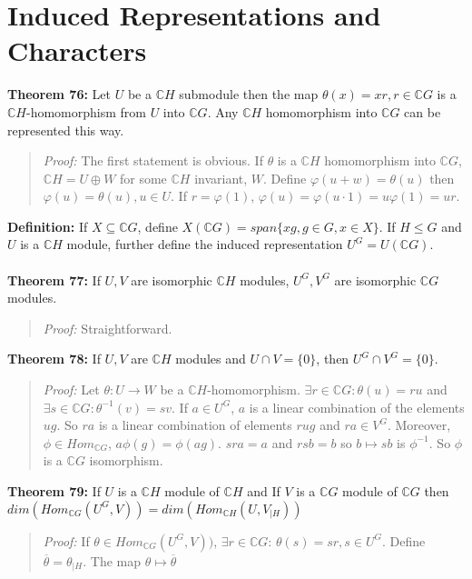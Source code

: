 {\section{Induced Representations and Characters}
{\bf Theorem 76:}
Let $U$ be a ${\mathbb C}H$ submodule then the map $\theta(x) = xr, r \in {\mathbb C}G$ is
a ${\mathbb C}H$-homomorphism from $U$ into ${\mathbb C}G$.  Any ${\mathbb C}H$
homomorphism into ${\mathbb C}G$ can be represented this way.
\begin{quote}
\emph{Proof:}
The first statement is obvious.  If $\theta$ is a ${\mathbb C}H$ homomorphism into
${\mathbb C}G$, ${\mathbb C}H= U \oplus W$ for some ${\mathbb C}H$ invariant, $W$.
Define 
$\varphi(u+w)= \theta(u)$ then
$\varphi(u)= \theta(u), u \in U$.  If $r= \varphi(1)$, 
$\varphi(u)= \varphi(u \cdot 1)=
u \varphi(1)= ur $.
\end{quote}
{\bf Definition:}
If $X \subseteq {\mathbb C}G$, define $X({\mathbb C}G)= span \{ xg, g \in G, x \in X \}$.
If $H \le G$ and $U$ is a ${\mathbb C}H$ module,
further define the induced representation $U^G= U({\mathbb C}G)$.
\\
\\
{\bf Theorem 77:}
If $U, V$ are isomorphic ${\mathbb C}H$ modules, $U^G, V^G$ are isomorphic  ${\mathbb C}G$
modules.
\begin{quote}
\emph{Proof:}  
Straightforward.
\end{quote}
{\bf Theorem 78:}
If $U, V$ are ${\mathbb C}H$ modules and $U \cap V= \{ 0 \}$, then $U^G \cap V^G = \{ 0 \}$.
\begin{quote}
\emph{Proof:}  
Let $\theta: U \rightarrow W$ be a ${\mathbb C}H$-homomorphism.  
$\exists r \in {\mathbb C}G: \theta(u)= ru$ and
$\exists s \in {\mathbb C}G: \theta^{-1}(v)= sv$.  If $a \in U^G$, $a$ is a linear combination of
the elements $ug$.  So $ra$ is a linear combination of elements $rug$ and $ra \in V^G$.  Moreover,
$\phi \in Hom_{{\mathbb C} G}$, $a\phi(g)= \phi(ag)$.  $sra=a$ and $rsb=b$ so $b \mapsto sb$ is $\phi^{-1}$.
So $\phi$ is a ${\mathbb C} G$ isomorphism.
\end{quote}
{\bf Theorem 79:}
If $U$ is a ${\mathbb C}H$ module of ${\mathbb C}H$ and
If $V$ is a ${\mathbb C}G$ module of ${\mathbb C}G$ then
$ dim(Hom_{{\mathbb C}G}(U^G, V))= dim(Hom_{{\mathbb C}H}(U, V_{|H}))$
\begin{quote}
\emph{Proof:}  
If $\theta \in
Hom_{{\mathbb C}G}(U^G, V)) $, 
$\exists r \in {\mathbb C}G$: $\theta(s)= sr, s \in U^G$.  Define
${\overline \theta}= \theta_{|H}$.   The map $\theta \mapsto {\overline \theta}$

\end{quote}}
